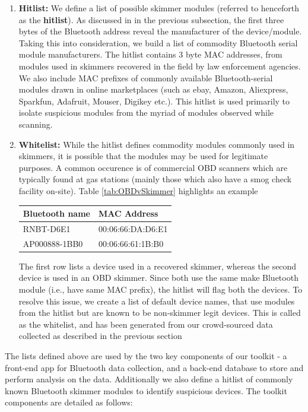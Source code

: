 \begin{enumerate}
\item \textbf{Hitlist: } We define a list of possible skimmer modules (referred
to henceforth as the \textbf{hitlist}). As discussed in in the previous
subsection, the first three bytes of the Bluetooth address reveal the
manufacturer of the device/module. Taking this into consideration, we build a
list of commodity Bluetooth serial module manufacturers. The hitlist contains 3
byte MAC addresses, from modules used in skimmers recovered in the field by law
enforcement agencies. We also include MAC prefixes of commonly available
Bluetooth-serial modules drawn in online marketplaces (such as ebay, Amazon,
Aliexpress, Sparkfun, Adafruit, Mouser, Digikey etc.). This hitlist is used
primarily to isolate suspicious modules from the myriad of modules observed
while scanning.

\item \textbf{Whitelist: } While the hitlist defines commodity modules commonly
used in skimmers, it is possible that the modules may be used for legitimate
purposes. A common occurence is of commercial OBD scanners which are typically
found at gas stations (mainly those which also have a smog check facility
on-site). Table \ref{tab:OBDvSkimmer} highlights an example

\begin{center}
\begin{tabu} to 0.8\columnwidth { | X[l] | X[c] | } \hline \textbf{Bluetooth
name} & \textbf{MAC Address} \\ \hline RNBT-D6E1 & 00:06:66:DA:D6:E1 \\ \hline
AP000888-1BB0 & 00:06:66:61:1B:B0\\ \hline
\end{tabu}
\label{tab:OBDvSkimmer}
\end{center}

The first row lists a device used in a recovered skimmer, whereas the second
device is used in an OBD skimmer. Since both use the same make Bluetooth module
(i.e., have same MAC prefix), the hitlist will flag both the devices. To resolve
this issue, we create a list of default device names, that use modules from the
hitlist but are known to be non-skimmer legit devices. This is called as the
whitelist, and has been generated from our crowd-sourced data collected as
described in the previous section
\end{enumerate}

The lists defined above are used by the two key components of our toolkit - a
front-end app for Bluetooth data collection, and a back-end database to store
and perform analysis on the data. Additionally we also define a hitlist of
commonly known Bluetooth skimmer modules to identify suspicious devices. The
toolkit components are detailed as follows:

